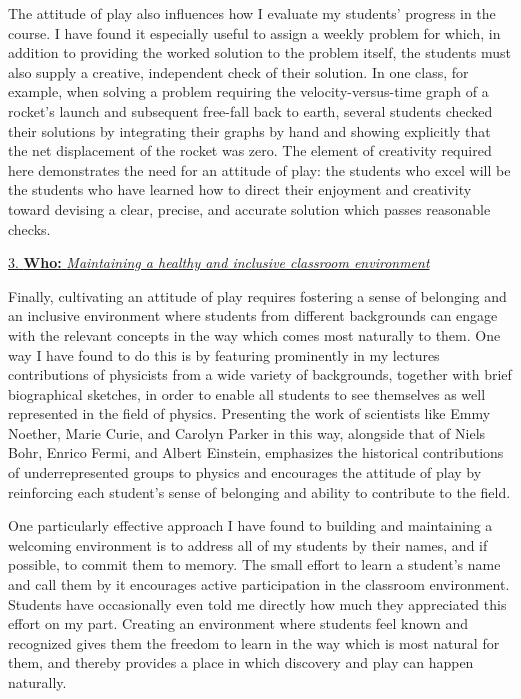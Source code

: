 \documentclass[12pt, tightenlines, onecolumn, showpacs, amsfonts, aps, prc, nofootinbib, floatfix]{revtex4-2}
\begin{document}
\medskip

	The attitude of play also influences how I evaluate my students' progress in the course.  I have found it especially useful to assign a weekly problem for which, in addition to providing the worked solution to the problem itself, the students must also supply a creative, independent check of their solution.  In one class, for example, when solving a problem requiring the velocity-versus-time graph of a rocket's launch and subsequent free-fall back to earth, several students checked their solutions by integrating their graphs by hand and showing explicitly that the net displacement of the rocket was zero.  The element of creativity required here demonstrates the need for an attitude of play: the students who excel will be the students who have learned how to direct their enjoyment and creativity toward devising a clear, precise, and accurate solution which passes reasonable checks.  
	
\medskip

\noindent \underline{3. \textbf{Who:} \textit{Maintaining a healthy and inclusive classroom environment}}

\medskip

Finally, cultivating an attitude of play requires fostering a sense of belonging and an inclusive environment where students from different backgrounds can engage with the relevant concepts in the way which comes most naturally to them.  One way I have found to do this is by featuring prominently in my lectures contributions of physicists from a wide variety of backgrounds, together with brief biographical sketches, in order to enable all students to see themselves as well represented in the field of physics.  Presenting the work of scientists like Emmy Noether, Marie Curie, and Carolyn Parker in this way, alongside that of Niels Bohr, Enrico Fermi, and Albert Einstein, emphasizes the historical contributions of underrepresented groups to physics and encourages the attitude of play by reinforcing each student's sense of belonging and ability to contribute to the field.

\medskip

One particularly effective approach I have found to building and maintaining a welcoming environment is to address all of my students by their names, and if possible, to commit them to memory.  The small effort to learn a student's name and call them by it encourages active participation in the classroom environment.  Students have occasionally even told me directly how much they appreciated this effort on my part.  Creating an environment where students feel known and recognized gives them the freedom to learn in the way which is most natural for them, and thereby provides a place in which discovery and play can happen naturally.
\end{document}
